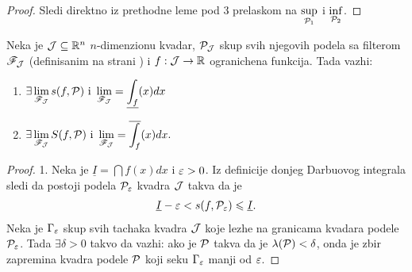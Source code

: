 \documentclass[../main.tex]{subfiles}
\begin{document}
    \begin{proof}
    	Sledi direktno iz prethodne leme pod 3 prelaskom na $\displaystyle{\sup_{\mathcal{P}_1}}$ i $\displaystyle{\inf_{\mathcal{P}_2}}$.
    \end{proof}

    \begin{te}
	Neka je $\mathcal{J}\subseteq \mathbb{R}^n$ $n$-dimenzionu kvadar, $\mathcal{P}_{\mathcal{J}}$ skup svih njegovih podela sa filterom $\mathscr{F}_{\mathcal{J}}$ (definisanim na strani \pageref{filterpodela}) i 
	$f: \mathcal{J} \to \mathbb{R}$ ogranichena funkcija. Tada vazhi:
	\begin{enumerate}
	    \item 
	    	$\displaystyle{\exists \lim_{\mathscr{F}_{\mathcal{J}}} s(f,\mathcal{P}) \text{ i } \lim_{\mathscr{F}_{\mathcal{J}}} = \underline{\int_{f}}(x)dx}$
	    \item 
	    	$\displaystyle{\exists \lim_{\mathscr{F}_{\mathcal{J}}} S(f,\mathcal{P}) \text{ i } \lim_{\mathscr{F}_{\mathcal{J}}} = \overline{\int_{f}}(x)dx}.$
	\end{enumerate}
    \end{te}

    \begin{proof}
    	1. Neka je $\underline{I} =  \dint f(x)dx$ i $\varepsilon>0$. Iz definicije donjeg Darbuovog integrala sledi da postoji podela $\mathcal{P}_\varepsilon$ kvadra $\mathcal{J}$
	takva da je  
	\begin{align}
	    \label{pepodela}
	    \underline{I}-\varepsilon < s(f,\mathcal{P}_\varepsilon)\leqslant \underline{I}.
	\end{align}
	Neka je $\Gamma_\varepsilon$ skup svih tachaka kvadra $\mathcal{J}$ koje lezhe na granicama kvadara podele $\mathcal{P}_\varepsilon$. 
	Tada $\exists\delta>0$ takvo da vazhi: ako je $\mathcal{P}$ takva da je $\lambda(\mathcal P)<\delta$, onda je zbir zapremina kvadra podele $\mathcal P$ koji seku
	$\Gamma_\varepsilon$ manji od $\varepsilon$.
    \end{proof}
\end{document}
